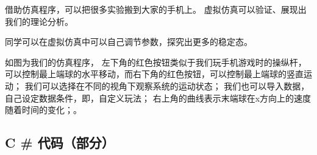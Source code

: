 \documentclass[12pt,a4paper]{ctexart}
\begin{document}
借助仿真程序，可以把很多实验搬到大家的手机上。
虚拟仿真可以验证、展现出我们的理论分析。

同学可以在虚拟仿真中可以自己调节参数，探究出更多的稳定态。

如图为我们的仿真程序，
左下角的红色按钮类似于我们玩手机游戏时的操纵杆，可以控制最上端球的水平移动，而右下角的红色按钮，可以控制最上端球的竖直运动；
我们可以选择在不同的视角下观察系统的运动状态；
我们也可以导入数据，自己设定数据条件，即，自定义玩法；
右上角的曲线表示末端球在x方向上的速度随着时间的变化；。


	
	
	
	
\subsection{C \# 代码（部分）}
	
\end{document}

